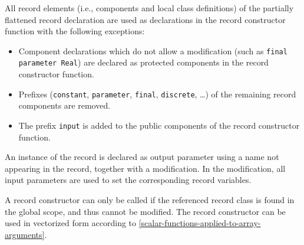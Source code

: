 All record elements (i.e., components and local class definitions) of the partially flattened record declaration are used as declarations in the record constructor function with the following exceptions:
\begin{itemize}
\item
  Component declarations which do not allow a modification (such as \lstinline!final parameter Real!) are declared as protected components in the record constructor function.
\item
  Prefixes (\lstinline!constant!, \lstinline!parameter!, \lstinline!final!, \lstinline!discrete!, \ldots) of the remaining record components are removed.
\item
  The prefix \lstinline!input! is added to the public components of the record constructor function.
\end{itemize}

An instance of the record is declared as output parameter using a name not appearing in the record, together with a modification.
In the modification, all input parameters are used to set the corresponding record variables.

A record constructor can only be called if the referenced record class is found in the global scope, and thus cannot be modified.
The record constructor can be used in vectorized form according to \cref{scalar-functions-applied-to-array-arguments}.

